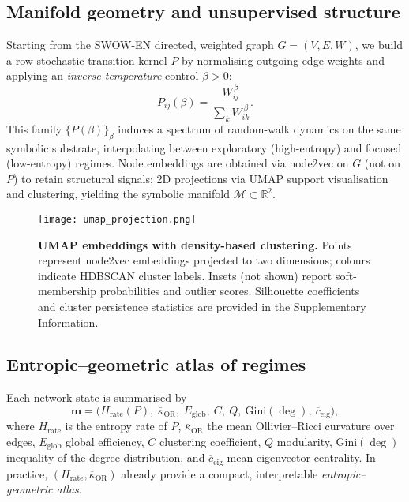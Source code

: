\documentclass[fleqn,10pt]{wlscirep}
\begin{document}
\subsection*{Manifold geometry and unsupervised structure}
Starting from the SWOW-EN directed, weighted graph $G=(V,E,W)$, we build a row-stochastic transition kernel $P$ by normalising outgoing edge weights and applying an \textit{inverse-temperature} control $\beta>0$:
\begin{equation}
P_{ij}(\beta)=\frac{W_{ij}^{\,\beta}}{\sum_{k} W_{ik}^{\,\beta}}.
\end{equation}
This family $\{P(\beta)\}_{\beta}$ induces a spectrum of random-walk dynamics on the same symbolic substrate, interpolating between exploratory (high-entropy) and focused (low-entropy) regimes. Node embeddings are obtained via node2vec on $G$ (not on $P$) to retain structural signals; 2D projections via UMAP support visualisation and clustering, yielding the symbolic manifold $\mathcal{M}\subset\mathbb{R}^2$.

\begin{figure}[htbp]\centering
\texttt{[image: umap\_projection.png]}
\caption{\textbf{UMAP embeddings with density-based clustering.} Points represent node2vec embeddings projected to two dimensions; colours indicate HDBSCAN cluster labels. Insets (not shown) report soft-membership probabilities and outlier scores. Silhouette coefficients and cluster persistence statistics are provided in the Supplementary Information.}
\label{fig:umap}
\end{figure}

\subsection*{Entropic--geometric atlas of regimes}
Each network state is summarised by
\begin{equation}
\mathbf{m}=\big(H_{\mathrm{rate}}(P),\ \overline{\kappa}_{\mathrm{OR}},\ E_{\mathrm{glob}},\ C,\ Q,\ \mathrm{Gini}(\deg),\ \overline{c}_{\mathrm{eig}}\big),
\end{equation}
where $H_{\mathrm{rate}}$ is the entropy rate of $P$, $\overline{\kappa}_{\mathrm{OR}}$ the mean Ollivier--Ricci curvature over edges, $E_{\mathrm{glob}}$ global efficiency, $C$ clustering coefficient, $Q$ modularity, $\mathrm{Gini}(\deg)$ inequality of the degree distribution, and $\overline{c}_{\mathrm{eig}}$ mean eigenvector centrality. In practice, $(H_{\mathrm{rate}},\overline{\kappa}_{\mathrm{OR}})$ already provide a compact, interpretable \emph{entropic--geometric atlas}.
\end{document}
